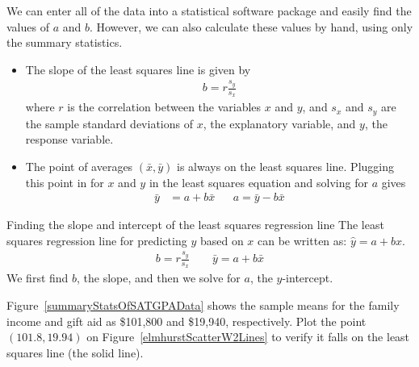 We can enter all of the data into a statistical software package and easily find the values of $a$ and $b$.  However, we can also calculate these values by hand, using only the summary statistics.
\begin{itemize}
\item The slope of the least squares line is given by
\begin{eqnarray*}
b = r\frac{s_y}{s_x}
\label{slopeOfLSRLine}
\end{eqnarray*}
where $r$ is the correlation between the variables $x$ and $y$, and $s_x$ and $s_y$ are the sample standard deviations of $x$, the explanatory variable, and $y$, the response variable.
\item The point of averages $(\bar{x}, \bar{y})$ is always on the least squares line. Plugging this point in for $x$ and $y$ in the least squares equation and solving for $a$ gives
\begin{align*}
\bar{y} &= a  + b\bar{x}
&&a=\bar{y}-b\bar{x}
\label{interceptOfLSRLine}
\end{align*}
\end{itemize}


\begin{onebox}{Finding the slope and intercept of the least squares regression line}
The least squares regression line for predicting $y$ based on $x$ can be written as:  $\hat{y}=a+bx$.  
\begin{align*}
b=r\frac{s_y}{s_x} \qquad \bar{y} = a + b\bar{x}
\end{align*}
We first find $b$, the slope, and then we solve for $a$, the $y$-intercept.  
\end{onebox}

\begin{exercisewrap}
\begin{nexercise}
Figure~\ref{summaryStatsOfSATGPAData} shows the sample means for the family income and gift aid as \$101,800 and \$19,940, respectively. Plot the point $(101.8, 19.94)$ on Figure~\ref{elmhurstScatterW2Lines} to verify it falls on the least squares line (the solid line).\footnotemark 
\end{nexercise}
\end{exercisewrap}

